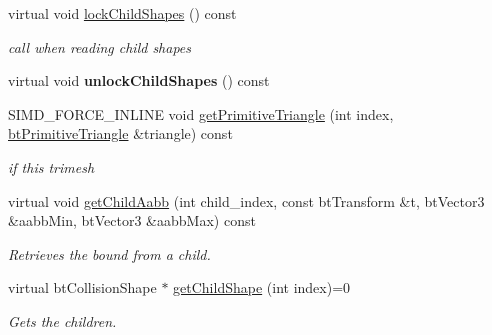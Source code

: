 \begin{DoxyCompactItemize}
\item 
\mbox{\label{classbtGImpactShapeInterface_a365c563e95c59eed2ebf2487dcfc11b4}} 
virtual void \hyperlink{classbtGImpactShapeInterface_a365c563e95c59eed2ebf2487dcfc11b4}{lock\+Child\+Shapes} () const
\begin{DoxyCompactList}\small\item\em call when reading child shapes \end{DoxyCompactList}\item 
\mbox{\label{classbtGImpactShapeInterface_aee8dcc5803c795a4b5c4b16e8003b400}} 
virtual void {\bfseries unlock\+Child\+Shapes} () const
\item 
\mbox{\label{classbtGImpactShapeInterface_a13d9c190157bb9b0087cdbcdf940f4ac}} 
S\+I\+M\+D\+\_\+\+F\+O\+R\+C\+E\+\_\+\+I\+N\+L\+I\+NE void \hyperlink{classbtGImpactShapeInterface_a13d9c190157bb9b0087cdbcdf940f4ac}{get\+Primitive\+Triangle} (int index, \hyperlink{classbtPrimitiveTriangle}{bt\+Primitive\+Triangle} \&triangle) const
\begin{DoxyCompactList}\small\item\em if this trimesh \end{DoxyCompactList}\item 
\mbox{\label{classbtGImpactShapeInterface_a1e01c9d3c05ee9d38219d5bf92fc0f41}} 
virtual void \hyperlink{classbtGImpactShapeInterface_a1e01c9d3c05ee9d38219d5bf92fc0f41}{get\+Child\+Aabb} (int child\+\_\+index, const bt\+Transform \&t, bt\+Vector3 \&aabb\+Min, bt\+Vector3 \&aabb\+Max) const
\begin{DoxyCompactList}\small\item\em Retrieves the bound from a child. \end{DoxyCompactList}\item 
\mbox{\label{classbtGImpactShapeInterface_a9f2827a4cb6e8376eb54aea84a8cc87b}} 
virtual bt\+Collision\+Shape $\ast$ \hyperlink{classbtGImpactShapeInterface_a9f2827a4cb6e8376eb54aea84a8cc87b}{get\+Child\+Shape} (int index)=0
\begin{DoxyCompactList}\small\item\em Gets the children. \end{DoxyCompactList}\item 

\end{DoxyCompactItemize}
